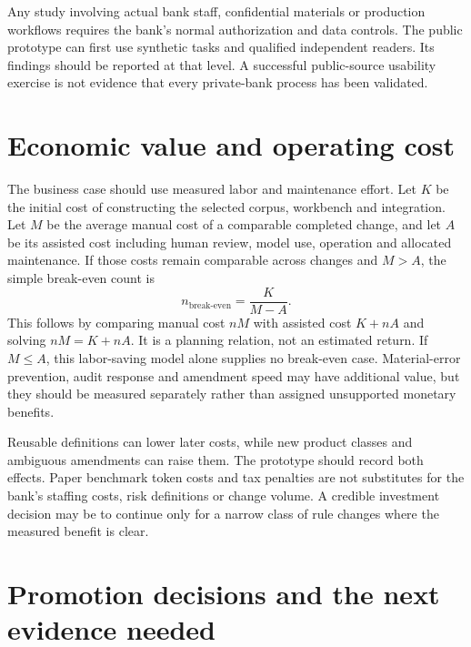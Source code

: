 Any study involving actual bank staff, confidential materials or production
workflows requires the bank's normal authorization and data controls. The public
prototype can first use synthetic tasks and qualified independent readers.
Its findings should be reported at that level. A successful public-source
usability exercise is not evidence that every private-bank process has been
validated.

\section{Economic value and operating cost}
\label{merge:P-04-prototype:06}


The business case should use measured labor and maintenance effort. Let $K$ be
the initial cost of constructing the selected corpus, workbench and integration.
Let $M$ be the average manual cost of a comparable completed change, and let $A$
be its assisted cost including human review, model use, operation and allocated
maintenance. If those costs remain comparable across changes and $M>A$, the
simple break-even count is
\begin{equation}
 n_{\mathrm{break\text{-}even}}=\frac{K}{M-A}.
 \label{eq:cost}
\end{equation}
This follows by comparing manual cost $nM$ with assisted cost $K+nA$ and solving
$nM=K+nA$. It is a planning relation, not an estimated return. If $M\leq A$, this
labor-saving model alone supplies no break-even case. Material-error prevention,
audit response and amendment speed may have additional value, but they should be
measured separately rather than assigned unsupported monetary benefits.

Reusable definitions can lower later costs, while new product classes and
ambiguous amendments can raise them. The prototype should record both effects.
Paper benchmark token costs and tax penalties are not substitutes for the bank's
staffing costs, risk definitions or change volume. A credible investment decision
may be to continue only for a narrow class of rule changes where the measured
benefit is clear.

\section{Promotion decisions and the next evidence needed}
\label{merge:M09:12}


